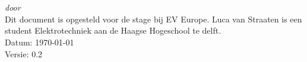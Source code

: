 \begin{titlepage}
    \vspace*{5cm}
    \makeatletter
    \begin{center}
        \begin{Huge}
            \@title
        \end{Huge}\\[0.1cm]
        \begin{Large}
            \@subtitle
        \end{Large}\\
        \emph{door}\\
        \@author
        \vfill
        Dit document is opgesteld voor de stage bij EV Europe. Luca van
        Straaten is een student Elektrotechniek aan de Haagse Hogeschool te
        delft.\\
        \vspace{.5cm}
        Datum: \today\\
        Versie: 0.2
    \end{center}
    \makeatother
\end{titlepage}

\newpage

